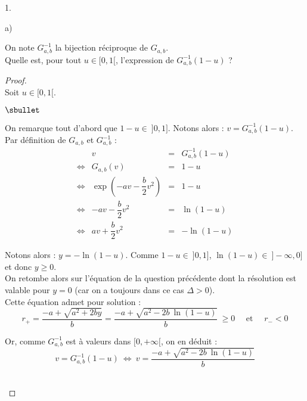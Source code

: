 \begin{noliste}{1.}
\begin{noliste}{a)}
  \item On note $G_{a,b}^{-1}$ la bijection réciproque de
    $G_{a,b}$. \\
    Quelle est, pour tout $u\in[0,1[$, l'expression de
    $G_{a,b}^{-1}(1-u)$ ?

    \begin{proof}~\\
      Soit $u \in [0, 1[$. 
      \begin{noliste}{$\sbullet$}
      \item On remarque tout d'abord que $1 - u \in \ ]0, 1]$. Notons
        alors : $v = G_{a,b}^{-1}(1-u)$. \\
        Par définition de $G_{a,b}$ et $G^{-1}_{a,b}$ :
        \[
        \begin{array}{crcl}
          & v & = & G^{-1}_{a,b}(1-u) \\[.4cm]
          \Leftrightarrow & G_{a,b}(v) & = & 1 - u \\[.4cm]
          \Leftrightarrow & \exp\left(- a v - \dfrac{b}{2} v^2 \right) &
          = & 1 - u \\[.4cm] 
          \Leftrightarrow & - a v - \dfrac{b}{2} v^2 & = & \ln(1 - u) \\[.4cm]
          \Leftrightarrow & a v + \dfrac{b}{2} v^2 & = & -\ln(1 - u) 
        \end{array}
        \]

      \item Notons alors : $y = -\ln(1-u)$. Comme $1-u \in \ ]0,1]$,
        $\ln(1-u) \in \ ]-\infty, 0]$ et donc $y \geq 0$.\\
        On retombe alors sur l'équation de la question précédente dont
        la résolution est valable pour $y = 0$ (car on a toujours dans
        ce cas $\Delta > 0$).\\
        Cette équation admet pour solution :
        \[
        r_+ = \dfrac{-a + \sqrt{a^2 + 2by}}{b} = \dfrac{-a + \sqrt{a^2
            - 2b \ \ln(1-u)}}{b} \ \geq 0 \quad \mbox{ et } \quad r_- < 0
        \]

      \item Or, comme $G^{-1}_{a,b}$ est à valeurs dans $[0, +\infty[$,
        on en déduit :
        \[
        v = G^{-1}_{a,b}(1-u) \ \Leftrightarrow \ v = \dfrac{-a +
          \sqrt{a^2 - 2b \ \ln(1-u)}}{b}
        \]
      \end{noliste}
      \conc{Pour tout $u \in [0,1[$, $G^{-1}_{a,b}(1-u) = \dfrac{-a +
          \sqrt{a^2 - 2b \ \ln(1-u)}}{b}$.}~\\[-1cm]
    \end{proof}
  \end{noliste}



\end{noliste}
